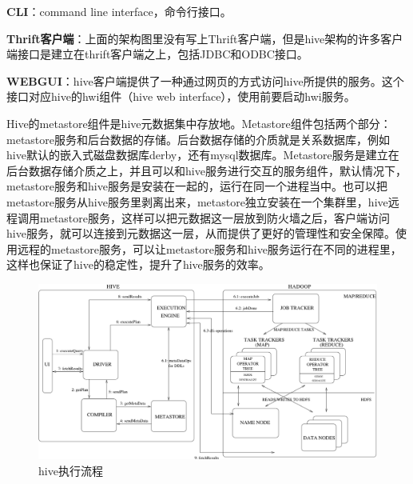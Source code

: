 \par \textbf{CLI}：command line interface，命令行接口。
\par \textbf{Thrift客户端}：上面的架构图里没有写上Thrift客户端，但是hive架构的许多客户端接口是建立在thrift客户端之上，包括JDBC和ODBC接口。
\par \textbf{WEBGUI}：hive客户端提供了一种通过网页的方式访问hive所提供的服务。这个接口对应hive的hwi组件（hive web interface），使用前要启动hwi服务。
\par Hive的metastore组件是hive元数据集中存放地。Metastore组件包括两个部分：metastore服务和后台数据的存储。后台数据存储的介质就是关系数据库，例如hive默认的嵌入式磁盘数据库derby，还有mysql数据库。Metastore服务是建立在后台数据存储介质之上，并且可以和hive服务进行交互的服务组件，默认情况下，metastore服务和hive服务是安装在一起的，运行在同一个进程当中。也可以把metastore服务从hive服务里剥离出来，metastore独立安装在一个集群里，hive远程调用metastore服务，这样可以把元数据这一层放到防火墙之后，客户端访问hive服务，就可以连接到元数据这一层，从而提供了更好的管理性和安全保障。使用远程的metastore服务，可以让metastore服务和hive服务运行在不同的进程里，这样也保证了hive的稳定性，提升了hive服务的效率。
\begin{figure}[htbp]
\centering\includegraphics[width=\linewidth]{figures/hive-2.png}
\caption{hive执行流程}\label{fig-hive-2}
\end{figure} 
